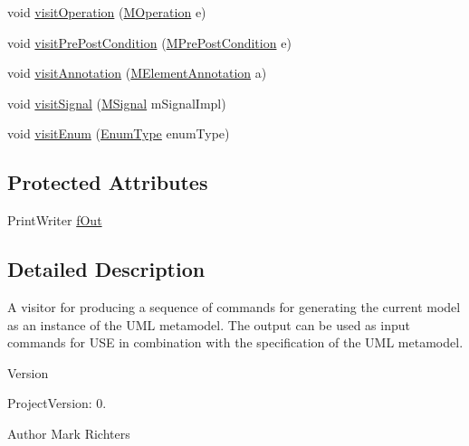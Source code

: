 \begin{DoxyCompactItemize}
\item 
void \hyperlink{classorg_1_1tzi_1_1use_1_1uml_1_1mm_1_1_m_m_instance_generator_aa339b8af808fdbdbe694e45f59f1a6c8}{visit\-Operation} (\hyperlink{classorg_1_1tzi_1_1use_1_1uml_1_1mm_1_1_m_operation}{M\-Operation} e)
\item 
void \hyperlink{classorg_1_1tzi_1_1use_1_1uml_1_1mm_1_1_m_m_instance_generator_a25a2844d6dc0b775fedef0b1b292cb13}{visit\-Pre\-Post\-Condition} (\hyperlink{classorg_1_1tzi_1_1use_1_1uml_1_1mm_1_1_m_pre_post_condition}{M\-Pre\-Post\-Condition} e)
\item 
void \hyperlink{classorg_1_1tzi_1_1use_1_1uml_1_1mm_1_1_m_m_instance_generator_a97007efbfbde4f3d3a6337019f019111}{visit\-Annotation} (\hyperlink{classorg_1_1tzi_1_1use_1_1uml_1_1mm_1_1_m_element_annotation}{M\-Element\-Annotation} a)
\item 
void \hyperlink{classorg_1_1tzi_1_1use_1_1uml_1_1mm_1_1_m_m_instance_generator_a4f4eb1eb6d803d5123d4d0cc0a38195d}{visit\-Signal} (\hyperlink{interfaceorg_1_1tzi_1_1use_1_1uml_1_1mm_1_1commonbehavior_1_1communications_1_1_m_signal}{M\-Signal} m\-Signal\-Impl)
\item 
void \hyperlink{classorg_1_1tzi_1_1use_1_1uml_1_1mm_1_1_m_m_instance_generator_a659d47e7b8ac010405683c3238ff390d}{visit\-Enum} (\hyperlink{classorg_1_1tzi_1_1use_1_1uml_1_1ocl_1_1type_1_1_enum_type}{Enum\-Type} enum\-Type)
\end{DoxyCompactItemize}
\subsection*{Protected Attributes}
\begin{DoxyCompactItemize}
\item 
Print\-Writer \hyperlink{classorg_1_1tzi_1_1use_1_1uml_1_1mm_1_1_m_m_instance_generator_a9e560ae4d906000bc78813ea1034bd2c}{f\-Out}
\end{DoxyCompactItemize}


\subsection{Detailed Description}
A visitor for producing a sequence of commands for generating the current model as an instance of the U\-M\-L metamodel. The output can be used as input commands for U\-S\-E in combination with the specification of the U\-M\-L metamodel.

\begin{DoxyVersion}{Version}

\end{DoxyVersion}
\begin{DoxyParagraph}{Project\-Version\-:}
0. 
\end{DoxyParagraph}
\begin{DoxyAuthor}{Author}
Mark Richters 
\end{DoxyAuthor}


